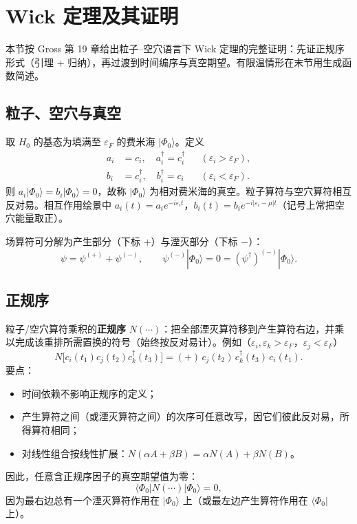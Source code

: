 \section{Wick 定理及其证明}

本节按 Gross 第 19 章给出粒子--空穴语言下 Wick 定理的完整证明：先证正规序形式（引理 + 归纳），再过渡到时间编序与真空期望。有限温情形在末节用生成函数简述。

\subsection{粒子、空穴与真空}

取 $H_0$ 的基态为填满至 $\varepsilon_F$ 的费米海 $|\Phi_0\rangle$。定义
\begin{equation}
\begin{aligned}
  a_i&=c_i,\quad a_i^\dagger=c_i^\dagger
  &&(\varepsilon_i>\varepsilon_F),\\
  b_i&=c_i^\dagger,\quad b_i^\dagger=c_i
  &&(\varepsilon_i<\varepsilon_F).
\end{aligned}
\end{equation}
则 $a_i|\Phi_0\rangle=b_i|\Phi_0\rangle=0$，故称 $|\Phi_0\rangle$ 为相对费米海的真空。粒子算符与空穴算符相互反对易。相互作用绘景中
$a_i(t)=a_i e^{-i\varepsilon_i t}$，$b_i(t)=b_i e^{-i|\varepsilon_i-\mu|t}$（记号上常把空穴能量取正）。

场算符可分解为产生部分（下标 $+$）与湮灭部分（下标 $-$）：
\begin{equation}
  \psi=\psi^{(+)}+\psi^{(-)},
  \qquad
  \psi^{(-)}|\Phi_0\rangle=0=(\psi^\dagger)^{(-)}|\Phi_0\rangle.
\end{equation}

\subsection{正规序}

粒子/空穴算符乘积的\textbf{正规序} $N(\cdots)$：把全部湮灭算符移到产生算符右边，并乘以完成该重排所需置换的符号（始终按反对易计）。例如（$\varepsilon_i,\varepsilon_k>\varepsilon_F$，$\varepsilon_j<\varepsilon_F$）
\begin{equation}
  N\bigl[c_i(t_1)c_j(t_2)c_k^\dagger(t_3)\bigr]
  =(+)\,c_j(t_2)\,c_k^\dagger(t_3)\,c_i(t_1).
\end{equation}
要点：
\begin{itemize}
  \item 时间依赖不影响正规序的定义；
  \item 产生算符之间（或湮灭算符之间）的次序可任意改写，因它们彼此反对易，所得算符相同；
  \item 对线性组合按线性扩展：$N(\alpha A+\beta B)=\alpha N(A)+\beta N(B)$。
\end{itemize}
因此，任意含正规序因子的真空期望值为零：
\begin{equation}
  \langle\Phi_0|N(\cdots)|\Phi_0\rangle=0,
\end{equation}
因为最右边总有一个湮灭算符作用在 $|\Phi_0\rangle$ 上（或最左边产生算符作用在 $\langle\Phi_0|$ 上）。

